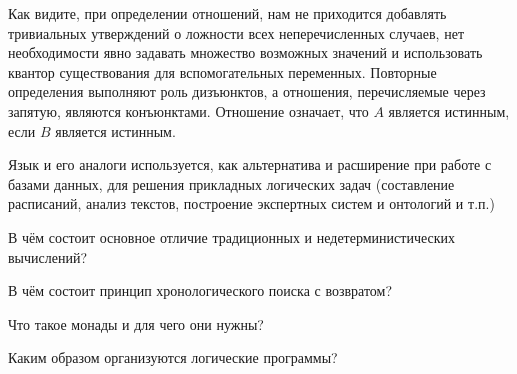 Как видите, при определении отношений, нам не приходится добавлять тривиальных утверждений о ложности всех неперечисленных случаев, нет необходимости явно задавать множество возможных значений и использовать квантор существования для вспомогательных переменных. Повторные определения выполняют роль дизъюнктов, а отношения, перечисляемые через запятую, являются конъюнктами. Отношение   означает, что $A$ является истинным, если $B$ является истинным.

Язык  и его аналоги используется, как альтернатива и расширение  при работе с базами данных, для решения прикладных логических задач (составление расписаний, анализ текстов, построение экспертных систем и онтологий и т.п.)

\begin{Queeze}
 \item В чём состоит основное отличие традиционных и недетерминистических вычислений?
 \item В чём состоит принцип хронологического поиска с возвратом?
 \item Что такое монады и для чего они нужны? 
 \item Каким образом организуются логические программы?
\end{Queeze}
